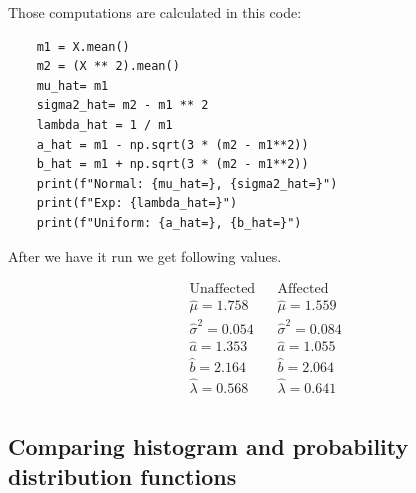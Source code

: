 \documentclass[12pt,a4paper]{article} %
\begin{document}
Those computations are calculated in this code:

\begin{lstlisting}
    m1 = X.mean()
    m2 = (X ** 2).mean()
    mu_hat= m1
    sigma2_hat= m2 - m1 ** 2
    lambda_hat = 1 / m1
    a_hat = m1 - np.sqrt(3 * (m2 - m1**2))
    b_hat = m1 + np.sqrt(3 * (m2 - m1**2))
    print(f"Normal: {mu_hat=}, {sigma2_hat=}")
    print(f"Exp: {lambda_hat=}")
    print(f"Uniform: {a_hat=}, {b_hat=}")
\end{lstlisting}

After we have it run we get following values.

\begin{align*}
  &\text{Unaffected}       & &\text{Affected} \\
  &\hat\mu = 1.758         & &\hat\mu = 1.559\\
  &\hat\sigma^2 = 0.054    & &\hat\sigma^2 = 0.084\\
  &\hat a = 1.353          & &\hat a = 1.055\\
  &\hat b = 2.164          & &\hat b = 2.064\\
  &\hat\lambda = 0.568     & &\hat\lambda = 0.641\\
\end{align*}


\subsection{Comparing histogram and probability distribution functions}
\end{document}
